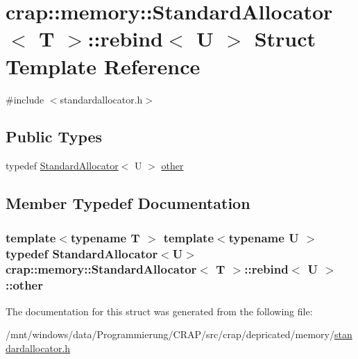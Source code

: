 \hypertarget{structcrap_1_1memory_1_1_standard_allocator_1_1rebind}{\section{crap\-:\-:memory\-:\-:Standard\-Allocator$<$ T $>$\-:\-:rebind$<$ U $>$ Struct Template Reference}
\label{structcrap_1_1memory_1_1_standard_allocator_1_1rebind}
}


{\ttfamily \#include $<$standardallocator.\-h$>$}

\subsection*{Public Types}
\begin{DoxyCompactItemize}
\item 
typedef \hyperlink{classcrap_1_1memory_1_1_standard_allocator}{Standard\-Allocator}$<$ U $>$ \hyperlink{structcrap_1_1memory_1_1_standard_allocator_1_1rebind_a1976d963dc57743beb4443536b6965d2}{other}
\end{DoxyCompactItemize}


\subsection{Member Typedef Documentation}
\hypertarget{structcrap_1_1memory_1_1_standard_allocator_1_1rebind_a1976d963dc57743beb4443536b6965d2}{
\subsubsection[{other}]{\setlength{\rightskip}{0pt plus 5cm}template$<$typename T $>$ template$<$typename U $>$ typedef {\bf Standard\-Allocator}$<$U$>$ {\bf crap\-::memory\-::\-Standard\-Allocator}$<$ T $>$\-::{\bf rebind}$<$ U $>$\-::{\bf other}}}\label{structcrap_1_1memory_1_1_standard_allocator_1_1rebind_a1976d963dc57743beb4443536b6965d2}


The documentation for this struct was generated from the following file\-:\begin{DoxyCompactItemize}
\item 
/mnt/windows/data/\-Programmierung/\-C\-R\-A\-P/src/crap/depricated/memory/\hyperlink{standardallocator_8h}{standardallocator.\-h}\end{DoxyCompactItemize}
